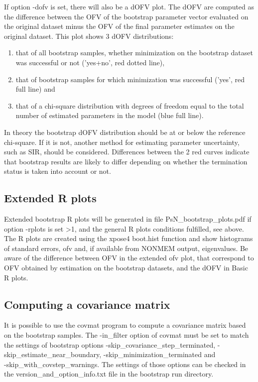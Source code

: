 If option -dofv is set, there will also be a dOFV plot.
The dOFV are computed as the difference between the OFV of the 
bootstrap parameter vector evaluated on the original dataset minus the OFV 
of the final parameter estimates on the original dataset. 
This plot shows 3 dOFV distributions:  
\begin{enumerate}
\item that of all bootstrap samples, whether minimization on the bootstrap dataset was successful or not ('yes+no', red dotted line), 
\item that of bootstrap samples for which minimization was successful ('yes', red full line) and 
\item that of a chi-square distribution with degrees of freedom equal to the total number of estimated parameters in the 
model (blue full line). 
\end{enumerate}
In theory the bootstrap dOFV distribution should be at or below the reference chi-square. If it is not, another method for estimating parameter uncertainty, such as SIR, should be considered. Differences between the 2 red curves indicate that bootstrap results are likely to differ depending on whether the termination status is taken into account or not. 

\subsection{Extended R plots}
Extended bootstrap R plots will be generated in file PsN\_bootstrap\_plots.pdf
if option -rplots is set >1,
and the general R plots conditions fulfilled, see above.
The R plots are created using the xpose4 boot.hist function
and show histograms of standard errors, ofv and, if available
from NONMEM output, eigenvalues.
Be aware of the difference between OFV in the extended ofv plot,
that correspond to OFV obtained by estimation on the bootstrap datasets,
and the dOFV in Basic R plots.


\subsection{Computing a covariance matrix}
It is possible to use the covmat program to compute a covariance matrix based on the bootstrap samples. The -in\_filter option of covmat must be set to match the settings of bootstrap options -skip\_covariance\_step\_terminated,
-skip\_estimate\_near\_boundary, -skip\_minimization\_terminated and\\
-skip\_with\_covstep\_warnings. The settings of those options can be checked in the version\_and\_option\_info.txt file in
the bootstrap run directory.

